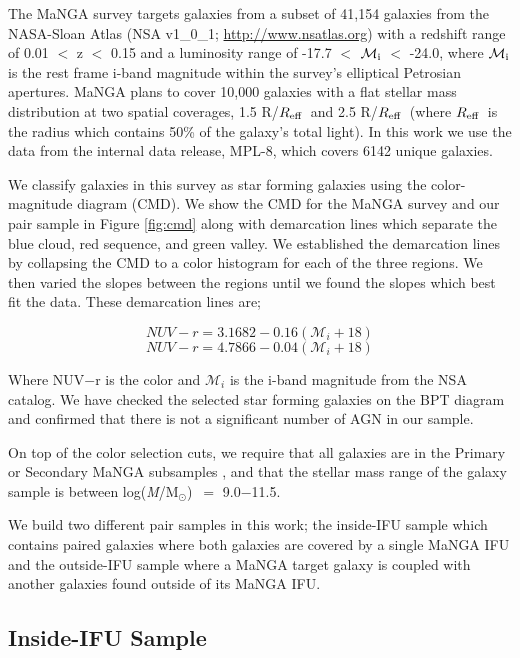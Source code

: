 \documentclass[iop,revtex4,twocolumn,apj,numberedappendix,appendixfloats]{emulateapj}
\newcommand{\reff}{$R_{\rm eff}$}
\newcommand{\logm}{log({\it M}/M$_{\odot}$)}
\begin{document}
The MaNGA survey targets galaxies from a subset of 41,154 galaxies from the NASA-Sloan Atlas (NSA v1\_0\_1; \url{http://www.nsatlas.org}) with a redshift range of 0.01 $<$ z $<$ 0.15 and a luminosity range of -17.7 $<$ $\mathcal{M_{\rm i}}$ $<$ -24.0, where $\mathcal{M_{\rm i}}$ is the rest frame i-band magnitude within the survey's elliptical Petrosian apertures. MaNGA plans to cover 10,000 galaxies with a flat stellar mass distribution at two spatial coverages, 1.5 R/\reff\ and 2.5 R/\reff\ (where \reff\ is the radius which contains 50\% of the galaxy's total light). In this work we use the data from the internal data release, MPL-8, which covers 6142 unique galaxies. 

We classify galaxies in this survey as star forming galaxies using the color-magnitude diagram (CMD). We show the CMD for the MaNGA survey and our pair sample in Figure \ref{fig:cmd} along with demarcation lines which separate the blue cloud, red sequence, and green valley. We established the demarcation lines by collapsing the CMD to a color histogram for each of the three regions. We then varied the slopes between the regions until we found the slopes which best fit the data. These demarcation lines are;

\begin{equation}\label{eq:blue}
NUV-r = 3.1682 - 0.16 (\mathcal{M}_i+18)
\end{equation}
\begin{equation}\label{eq:red}
NUV-r = 4.7866 - 0.04 (\mathcal{M}_i+18)
\end{equation}

Where NUV$-$r is the color and $\mathcal{M}_i$ is the i-band magnitude from the NSA catalog. We have checked the selected star forming galaxies on the BPT diagram \citep{Baldwin:1981} and confirmed that there is not a significant number of AGN in our sample.

On top of the color selection cuts, we require that all galaxies are in the Primary or Secondary MaNGA subsamples \citep{Wake:2017}, and that the stellar mass range of the galaxy sample is between \logm\ $=$ 9.0$-$11.5.

We build two different pair samples in this work; the inside-IFU sample which contains paired galaxies where both galaxies are covered by a single MaNGA IFU and the outside-IFU sample where a MaNGA target galaxy is coupled with another galaxies found outside of its MaNGA IFU. 

\subsection{Inside-IFU Sample}\label{sec:inside}
\end{document}
